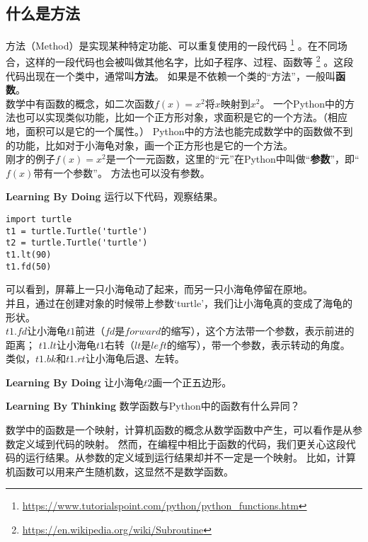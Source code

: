 \subsection{什么是方法}
方法（Method）是实现某种特定功能、可以重复使用的一段代码
\footnote{\url{https://www.tutorialspoint.com/python/python_functions.htm}}
。在不同场合，这样的一段代码也会被叫做其他名字，比如子程序、过程、函数等
\footnote{\url{https://en.wikipedia.org/wiki/Subroutine}}
。这段代码出现在一个类中，通常叫\textbf{方法}。
如果是不依赖一个类的“方法”，一般叫\textbf{函数}。\\
数学中有函数的概念，如二次函数$f(x) = x^2$将$x$映射到$x^2$。
一个Python中的方法也可以实现类似功能，比如一个正方形对象，求面积是它的一个方法。（相应地，面积可以是它的一个属性。）
Python中的方法也能完成数学中的函数做不到的功能，比如对于小海龟对象，画一个正方形也是它的一个方法。\\
刚才的例子$f(x) = x^2$是一个一元函数，这里的“元”在Python中叫做“\textbf{参数}”，即“$f(x)$带有一个参数”。
方法也可以没有参数。\\
\begin{paperbox}{\textbf{Learning By Doing}\starfive}
运行以下代码，观察结果。
\begin{lstlisting}[style=PythonStyle1, caption=Rectangle]
import turtle
t1 = turtle.Turtle('turtle')
t2 = turtle.Turtle('turtle')
t1.lt(90)
t1.fd(50)
\end{lstlisting}
\end{paperbox}
可以看到，屏幕上一只小海龟动了起来，而另一只小海龟停留在原地。\\
并且，通过在创建对象的时候带上参数`turtle'，我们让小海龟真的变成了海龟的形状。\\
$t1.fd$让小海龟$t1$前进（$fd$是$forward$的缩写），这个方法带一个参数，表示前进的距离；
$t1.lt$让小海龟$t1$右转（$lt$是$left$的缩写），带一个参数，表示转动的角度。\\
类似，$t1.bk$和$t1.rt$让小海龟后退、左转。
\begin{paperbox}{\textbf{Learning By Doing}\starfive}
让小海龟$t2$画一个正五边形。
\end{paperbox}
\begin{paperbox}{\textbf{Learning By Thinking\starthree}}
数学函数与Python中的函数有什么异同？
\end{paperbox}
数学中的函数是一个映射，计算机函数的概念从数学函数中产生，可以看作是从参数定义域到代码的映射。
然而，在编程中相比于函数的代码，我们更关心这段代码的运行结果。从参数的定义域到运行结果却并不一定是一个映射。
比如，计算机函数可以用来产生随机数，这显然不是数学函数。
